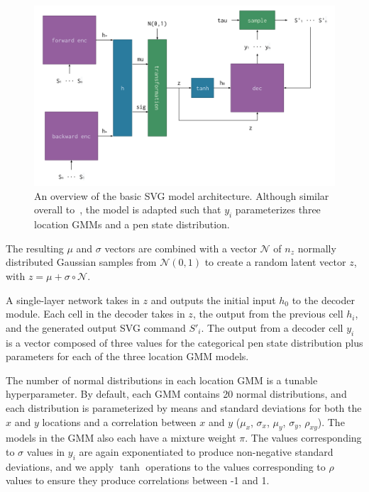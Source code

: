 \begin{figure}[h]
\centering
\caption[An overview of the basic SVG model architecture]{An overview of the basic SVG model architecture.
Although similar overall to~\cite{ha2017neural}, the model is adapted such that $y_i$ parameterizes three location GMMs and a pen state distribution.\label{fig:architecture}}
\includegraphics[width=\textwidth]{figures/architecture}
\end{figure}

The resulting $\mu$ and $\sigma$ vectors are combined with a vector $\mathcal{N}$ of $n_z$ normally distributed Gaussian samples from $\mathcal{N}(0,1)$ to create a random latent vector $z$, with $z = \mu + \sigma \circ \mathcal{N}$.

A single-layer network takes in $z$ and outputs the initial input $h_0$ to the decoder module.
Each cell in the decoder takes in $z$, the output from the previous cell $h_i$, and the generated output SVG command $S'_i$.
The output from a decoder cell $y_i$ is a vector composed of three values for the categorical pen state distribution plus parameters for each of the three location GMM models.

The number of normal distributions in each location GMM is a tunable hyperparameter.
By default, each GMM contains 20 normal distributions, and each distribution is parameterized by means and standard deviations for both the $x$ and $y$ locations and a correlation between $x$ and $y$ ($\mu_x$, $\sigma_x$, $\mu_y$, $\sigma_y$, $\rho_{xy}$).
The models in the GMM also each have a mixture weight $\pi$.
The values corresponding to $\sigma$ values in $y_i$ are again exponentiated to produce non-negative standard deviations, and we apply $\tanh$ operations to the values corresponding to $\rho$ values to ensure they produce correlations between -1 and 1. 

